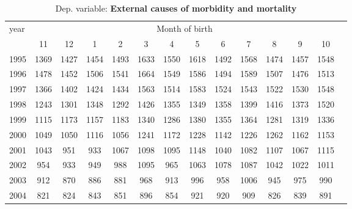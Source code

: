  \begin{table}[H] \begin{threeparttable} \centering \caption{Dep. variable: \textbf{External causes of morbidity and mortality}} {\def\sym#1{\ifmmode^{#1}\else\(^{#1}\)\fi} \begin{tabular}{l*{13}{c}} \toprule year & \multicolumn{12}{c}{Month of birth} \\ \cmidrule(lr){2-13} 
            &          11&          12&           1&           2&           3&           4&           5&           6&           7&           8&           9&          10\\
1995        &        1369&        1427&        1454&        1493&        1633&        1550&        1618&        1492&        1568&        1474&        1457&        1548\\
1996        &        1478&        1452&        1506&        1541&        1664&        1549&        1586&        1494&        1589&        1507&        1476&        1513\\
1997        &        1366&        1402&        1424&        1434&        1563&        1514&        1583&        1524&        1543&        1522&        1530&        1548\\
1998        &        1243&        1301&        1348&        1292&        1426&        1355&        1349&        1358&        1399&        1416&        1373&        1520\\
1999        &        1115&        1173&        1157&        1183&        1340&        1286&        1380&        1355&        1364&        1281&        1319&        1336\\
2000        &        1049&        1050&        1116&        1056&        1241&        1172&        1228&        1142&        1226&        1262&        1162&        1153\\
2001        &        1043&         951&         933&        1067&        1098&        1095&        1148&        1040&        1082&        1107&        1067&        1115\\
2002        &         954&         933&         949&         988&        1095&         965&        1063&        1078&        1087&        1042&        1022&        1011\\
2003        &         912&         870&         886&         881&         968&         913&         996&         958&        1006&         945&         975&         990\\
2004        &         821&         824&         843&         851&         896&         854&         921&         920&         909&         826&         839&         891\\

\end{tabular}}
\end{threeparttable}
\end{table}
